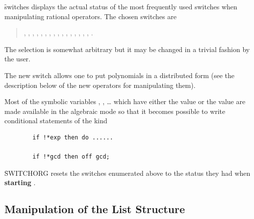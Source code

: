 \f{switches} displays the actual status of the most frequently used switches
when manipulating rational operators. The chosen switches are
\begin{quote}\sloppy\raggedright
  , , , , , , , ,
  , , , , ,
  , , , .
\end{quote}

The selection is somewhat arbitrary but it may be changed in a trivial
fashion by the user.

\hypertarget{switch:DISTRIBUTE}{}
The new switch  allows one to put polynomials in a
distributed form (see the description below of
the new operators for manipulating them).

Most of the symbolic variables , , \ldots{}
which have either the value  or the value  are made available in the
algebraic mode so that it becomes possible to write conditional
statements of the kind
\begin{verbatim}
        if !*exp then do ......

        if !*gcd then off gcd;
\end{verbatim}
\f{SWITCHORG} resets  the switches enumerated above to the status
they had when \textbf{starting} \REDUCE.

\subsection{Manipulation of the List Structure}


